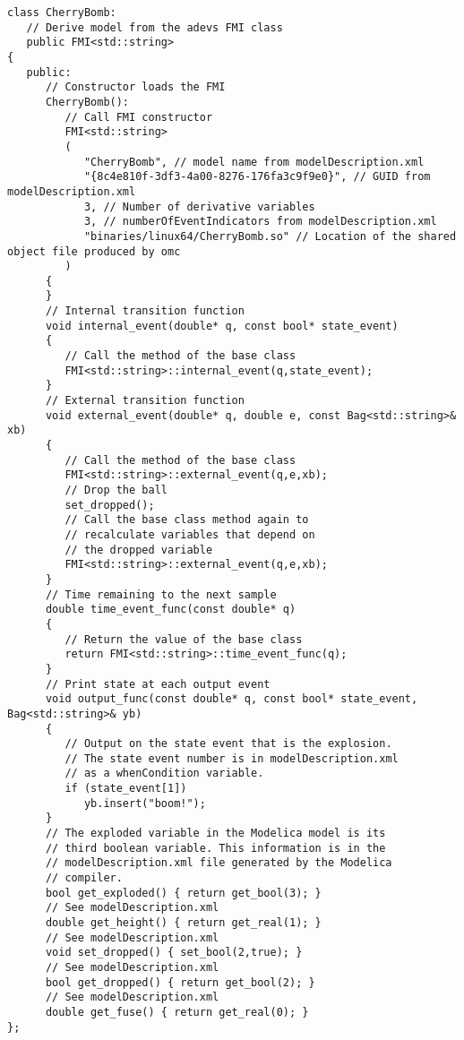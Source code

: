 \begin{verbatim}
class CherryBomb:
   // Derive model from the adevs FMI class
   public FMI<std::string>
{
   public:
      // Constructor loads the FMI
      CherryBomb():
         // Call FMI constructor
         FMI<std::string>
         (
            "CherryBomb", // model name from modelDescription.xml
            "{8c4e810f-3df3-4a00-8276-176fa3c9f9e0}", // GUID from modelDescription.xml
            3, // Number of derivative variables
            3, // numberOfEventIndicators from modelDescription.xml
            "binaries/linux64/CherryBomb.so" // Location of the shared object file produced by omc
         )
      {
      }
      // Internal transition function
      void internal_event(double* q, const bool* state_event)
      {
         // Call the method of the base class
         FMI<std::string>::internal_event(q,state_event);
      }
      // External transition function
      void external_event(double* q, double e, const Bag<std::string>& xb)
      {
         // Call the method of the base class
         FMI<std::string>::external_event(q,e,xb);
         // Drop the ball
         set_dropped();
         // Call the base class method again to 
         // recalculate variables that depend on
         // the dropped variable
         FMI<std::string>::external_event(q,e,xb);
      }
      // Time remaining to the next sample
      double time_event_func(const double* q)
      {
         // Return the value of the base class
         return FMI<std::string>::time_event_func(q);
      }
      // Print state at each output event
      void output_func(const double* q, const bool* state_event, Bag<std::string>& yb)
      {
         // Output on the state event that is the explosion.
         // The state event number is in modelDescription.xml
         // as a whenCondition variable.
         if (state_event[1])
            yb.insert("boom!");
      }
      // The exploded variable in the Modelica model is its 
      // third boolean variable. This information is in the
      // modelDescription.xml file generated by the Modelica
      // compiler.
      bool get_exploded() { return get_bool(3); }
      // See modelDescription.xml
      double get_height() { return get_real(1); }
      // See modelDescription.xml
      void set_dropped() { set_bool(2,true); }
      // See modelDescription.xml
      bool get_dropped() { return get_bool(2); }
      // See modelDescription.xml
      double get_fuse() { return get_real(0); }
};
\end{verbatim}

